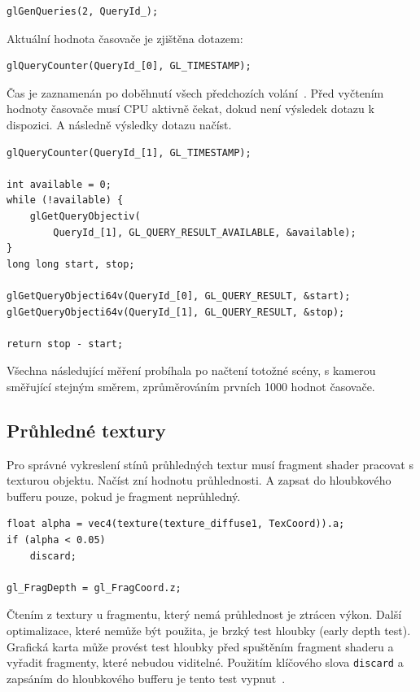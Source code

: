 \documentclass[thesis=M,czech]{FITthesis}[2019/12/23]
\begin{document}
\begin{verbatim}
glGenQueries(2, QueryId_);
\end{verbatim}

Aktuální hodnota časovače je zjištěna dotazem:

\begin{verbatim}
glQueryCounter(QueryId_[0], GL_TIMESTAMP);
\end{verbatim}

Čas je zaznamenán po doběhnutí všech předchozích volání~\cite{kronos_counter}. Před vy\-čte\-ním hodnoty časovače musí CPU aktivně čekat, dokud není výsledek dotazu k dispozici. A následně výsledky dotazu načíst.

\begin{verbatim}
glQueryCounter(QueryId_[1], GL_TIMESTAMP);

int available = 0;
while (!available) {
    glGetQueryObjectiv(
        QueryId_[1], GL_QUERY_RESULT_AVAILABLE, &available);
}
long long start, stop;

glGetQueryObjecti64v(QueryId_[0], GL_QUERY_RESULT, &start);
glGetQueryObjecti64v(QueryId_[1], GL_QUERY_RESULT, &stop);

return stop - start;
\end{verbatim}

Všechna následující měření probíhala po načtení totožné scény, s kamerou směřující stejným směrem, zprůměrováním prvních 1000 hodnot časovače.

\subsection{Průhledné textury}

Pro správné vykreslení stínů průhledných textur musí fragment shader pracovat s texturou objektu. Načíst zní hodnotu průhlednosti. A zapsat do hloubkového bufferu pouze, pokud je fragment neprůhledný.

\begin{verbatim}
float alpha = vec4(texture(texture_diffuse1, TexCoord)).a;
if (alpha < 0.05)
    discard;

gl_FragDepth = gl_FragCoord.z;
\end{verbatim}

Čtením z textury u fragmentu, který nemá průhlednost je ztrácen výkon. Další optimalizace, které nemůže být použita, je brzký test hloubky (early depth test). Grafická karta může provést test hloubky před spuštěním fragment shaderu a vyřadit fragmenty, které nebudou viditelné. Použitím klíčového slova \texttt{discard} a zapsáním do hloubkového bufferu je tento test vypnut~\cite{kronos_eft}.
\end{document}
